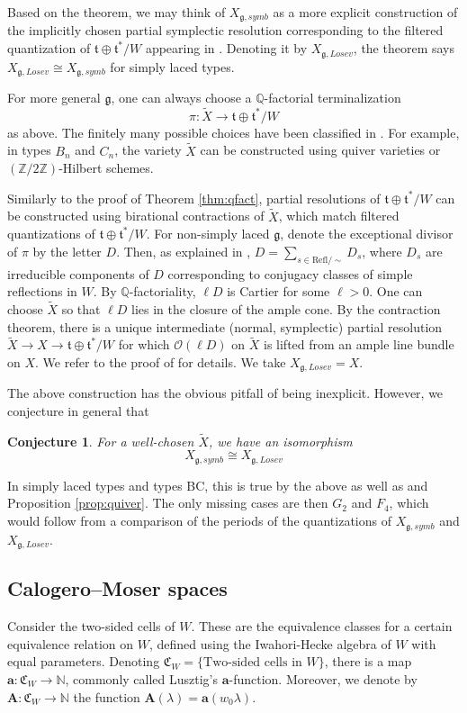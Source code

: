 \documentclass{amsart}
\numberwithin{equation}{section}
\newtheorem{conjecture}[lemma]{Conjecture}%
\theoremstyle{definition}
\newcommand{\cO}{\mathcal{O}}
\newcommand{\fg}{\mathfrak{g}}
\newcommand{\ft}{\mathfrak{t}}
\newcommand{\N}{{\mathbb N}}
\newcommand{\Z}{{\mathbb Z}}
\newcommand{\Q}{{\mathbb Q}}
\begin{document}
Based on the theorem, we may think of $X_{\fg,symb}$ as a more explicit construction of the implicitly chosen partial symplectic resolution corresponding to the filtered quantization of $\ft\oplus\ft^*/W$ appearing in \cite{Losev,BAL}. Denoting it by $X_{\fg,Losev}$, the theorem says $X_{\fg,Losev}\cong X_{\fg,symb}$ for simply laced types.

For more general $\fg$, one can always choose a $\Q$-factorial terminalization $$\pi: \widetilde{X}\to \ft\oplus \ft^*/W$$ as above. The finitely many possible choices have been classified in \cite{BellamyCounts}.
For example, in types $B_n$ and $C_n$, the variety $\widetilde{X}$ can be constructed using quiver varieties or $(\Z/2\Z)$-Hilbert schemes. 

Similarly to the proof of Theorem \ref{thm:qfact}, partial resolutions of $\ft\oplus \ft^*/W$ can be constructed using birational contractions of $\widetilde{X}$, which match filtered quantizations of $\ft\oplus \ft^*/W$.
For non-simply laced $\fg$, denote the exceptional divisor of $\pi$ by the letter $D$. Then, as explained in \cite[Proposition 2.1.]{BAL}, $D=\sum_{s\in \text{Refl}/\sim} D_s$, where $D_s$ are irreducible components of $D$ corresponding to conjugacy classes of simple reflections in $W$. By $\Q$-factoriality, $\ell D$ is Cartier for some $\ell>0$. One can choose $\widetilde{X}$ so that $\ell D$ lies in the closure of the ample cone. By the contraction theorem, there is a unique intermediate (normal, symplectic) partial resolution $\widetilde{X}\to X\to \ft\oplus \ft^*/W$ for which $\cO(\ell D)$ on $\widetilde{X}$ is lifted from an ample line bundle on $X$. We refer to the proof of \cite[Proposition 2.1.]{BAL} for details. We take $X_{\fg,Losev}=X$.

The above construction has the obvious pitfall of being inexplicit. However, 
we conjecture in general that
\begin{conjecture}
\label{conj:losev}
For a well-chosen $\widetilde{X}$, we have an isomorphism 
$$X_{\fg,symb}\cong X_{\fg,Losev}$$
\end{conjecture}
In simply laced types and types BC, this is true by the above as well as \cite[Remark 2.2.]{BAL} and Proposition \ref{prop:quiver}. The only missing cases are then $G_2$ and $F_4$, which would follow from a comparison of the periods of the quantizations of $X_{\fg,symb}$ and $X_{\fg,Losev}$.

\subsection{Calogero--Moser spaces}
Consider the two-sided cells of $W$. These are the equivalence classes for a certain equivalence relation on $W$, defined using the Iwahori-Hecke algebra of $W$ with equal parameters. Denoting $\mathfrak{C}_W=\{\text{Two-sided cells in } W\}$, there is a map $\mathbf{a}: \mathfrak{C}_W\to \N$, commonly called Lusztig's $\mathbf{a}$-function. Moreover, we denote by $\mathbf{A}:\mathfrak{C}_W\to\N$ the function $\mathbf{A}(\lambda)=\mathbf{a}(w_0\lambda)$.
\end{document}
